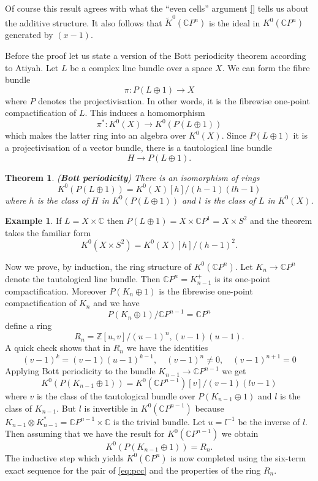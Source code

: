 \documentclass[a4paper,10pt]{article}
\theoremstyle{plain}%
\newtheorem{thm}{Theorem}
\theoremstyle{definition}
\newtheorem{exmp}{Example}
\theoremstyle{remark}
\newcommand{\ZZ}{\mathbb{Z}}
\newcommand{\CC}{\mathbb{C}}
\newcommand{\KR}{\widetilde{K}}   %
\newcommand{\cp}{\CC P}   %
\begin{document}
Of course this result agrees with what the ``even cells'' argument \ref{} tells us about the additive structure. It also follows that $\KR^0(\cp^n)$ is the ideal in $K^0(\cp^n)$ generated by $(x-1)$.

Before the proof let us state a version of the Bott periodicity theorem according to Atiyah. Let $L$ be a complex line bundle over a space $X$. We can form the fibre bundle
$$\pi: P(L\oplus 1)\to X$$
where $P$ denotes the projectivisation. In other words, it is the fibrewise one-point compactification of $L$. This induces a homomorphism
$$\pi^*:K^0(X)\to K^0(P(L\oplus 1))$$
which makes the latter ring into an algebra over $K^0(X)$. Since $P(L\oplus 1)$ it is a projectivisation of a vector bundle, there is a tautological line bundle 
$$H\to P(L\oplus 1).$$

\begin{thm}({\bf Bott periodicity})
There is an isomorphism of rings
$$K^0(P(L\oplus 1))=K^0(X)[h]/(h-1)(lh-1)$$
where $h$ is the class of $H$ in $K^0(P(L\oplus 1))$ and $l$ is the class of $L$ in $K^0(X)$.
\end{thm}

\begin{exmp}
If $L=X\times \CC$ then $P(L\oplus 1)=X\times \cp^1=X\times S^2$ and the theorem takes the familiar form 
$$K^0(X\times S^2)=K^0(X)[h]/(h-1)^2.$$
\end{exmp}

Now we prove, by induction, the ring structure of $K^0(\cp^n)$. Let $K_n\to \cp^n$ denote the tautological line bundle. Then $\cp^n=K_{n-1}^+$ is its one-point compactification. Moreover $P(K_n\oplus 1)$ is the fibrewise one-point compactification of $K_n$ and we have
\begin{equation}\label{eq:pcc}P(K_n\oplus 1)/\cp^{n-1}=\cp^n\end{equation}
define a ring
$$R_n=\ZZ[u,v]/(u-1)^n,(v-1)(u-1).$$
A quick check shows that in $R_n$ we have the identities
$$(v-1)^k=(v-1)(u-1)^{k-1},\quad (v-1)^n\neq 0, \quad (v-1)^{n+1}=0$$
Applying Bott periodicity to the bundle $K_{n-1}\to\cp^{n-1}$ we get
$$K^0(P(K_{n-1}\oplus 1)) = K^0(\cp^{n-1})[v]/(v-1)(lv-1)$$
where $v$ is the class of the tautological bundle over $P(K_{n-1}\oplus 1)$ and $l$ is the class of $K_{n-1}$. But $l$ is invertible in $K^0(\cp^{n-1})$ because $K_{n-1}\otimes K_{n-1}^\ast=\cp^{n-1}\times \CC$ is the trivial bundle. Let $u=l^{-1}$ be the inverse of $l$. Then assuming that we have the result for $K^0(\cp^{n-1})$ we obtain
$$K^0(P(K_{n-1}\oplus 1))=R_n.$$
The inductive step which yields $K^0(\cp^n)$ is now completed using the six-term exact sequence for the pair of \eqref{eq:pcc} and the properties of the ring $R_n$.
\end{document}
